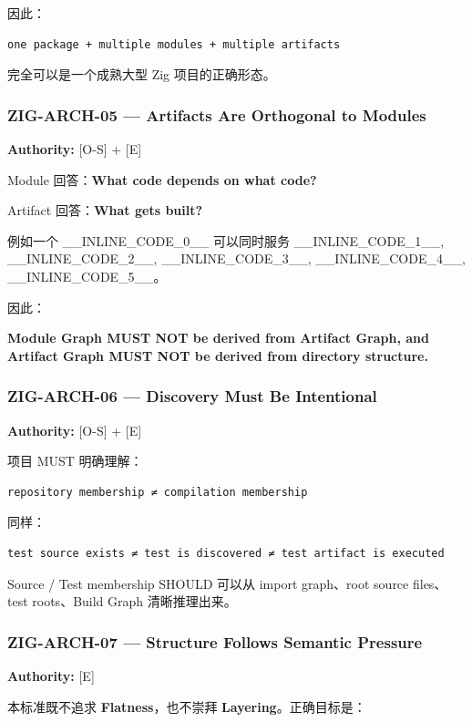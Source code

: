 \documentclass[11pt,a4paper]{article}
\begin{document}
因此：

\begin{lstlisting}[language=text]
one package + multiple modules + multiple artifacts
\end{lstlisting}
完全可以是一个成熟大型 Zig 项目的正确形态。

\subsubsection{ZIG-ARCH-05 — Artifacts Are Orthogonal to Modules}
\textbf{Authority:} [O-S] + [E]

Module 回答：\textbf{What code depends on what code?}

Artifact 回答：\textbf{What gets built?}

例如一个 \_\_INLINE\_CODE\_0\_\_ 可以同时服务 \_\_INLINE\_CODE\_1\_\_, \_\_INLINE\_CODE\_2\_\_, \_\_INLINE\_CODE\_3\_\_, \_\_INLINE\_CODE\_4\_\_, \_\_INLINE\_CODE\_5\_\_。

因此：

\begin{gfmBlockquote}
\textbf{Module Graph MUST NOT be derived from Artifact Graph, and Artifact Graph MUST NOT be derived from directory structure.}
\end{gfmBlockquote}
\subsubsection{ZIG-ARCH-06 — Discovery Must Be Intentional}
\textbf{Authority:} [O-S] + [E]

项目 MUST 明确理解：

\begin{lstlisting}[language=text]
repository membership ≠ compilation membership
\end{lstlisting}
同样：

\begin{lstlisting}[language=text]
test source exists ≠ test is discovered ≠ test artifact is executed
\end{lstlisting}
Source / Test membership SHOULD 可以从 import graph、root source files、test roots、Build Graph 清晰推理出来。

\subsubsection{ZIG-ARCH-07 — Structure Follows Semantic Pressure}
\textbf{Authority:} [E]

本标准既不追求 \textbf{Flatness}，也不崇拜 \textbf{Layering}。正确目标是：
\end{document}
